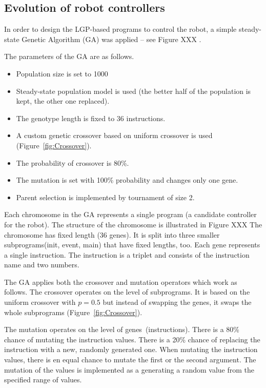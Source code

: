 \documentclass{ExcelAtFIT}
\begin{document}
\subsection{Evolution of robot controllers}
\label{sec:EvolutionOfRobotControllers}
In order to design the LGP-based programs to control the robot, a simple steady-state Genetic Algorithm (GA) was applied -- see Figure XXX
.

The parameters of the GA are as follows.
\begin{itemize}
	\item Population size is set to 1000
	\item Steady-state population model is used (the better half of the population is kept, the other one replaced).
	\item The genotype length is fixed to 36 instructions.
	\item A custom genetic crossover based on uniform crossover is used (Figure~\ref{fig:Crossover}).
	\item The probability of crossover is 80\%.
	\item The mutation is set with 100\% probability and changes only one gene.
	\item Parent selection is implemented by tournament of size 2.
\end{itemize}


Each chromosome in the GA represents a single program (a candidate controller for the robot).
The structure of the chromosome is illustrated in Figure XXX
The chromosome has fixed length (36 genes).
It is split into three smaller subprograms(init, event, main) that have fixed lengths, too.
Each gene represents a single instruction.
The instruction is a triplet and consists of the instruction name and two numbers.

The GA applies both the crossover and mutation operators which work as follows.
The crossover operates on the level of subprograms.
It is based on the uniform crossover with $p = 0.5$ but instead of swapping the genes, it swaps the whole subprograms (Figure~\ref{fig:Crossover}).

The mutation operates on the level of genes~(instructions).
There is a 80\% chance of mutating the instruction values.
There is a 20\% chance of replacing the instruction with a new, randomly generated one.
When mutating the instruction values, there is en equal chance to mutate the first or the second argument.
The mutation of the values is implemented as a generating a random value from the specified range of values.
\end{document}
